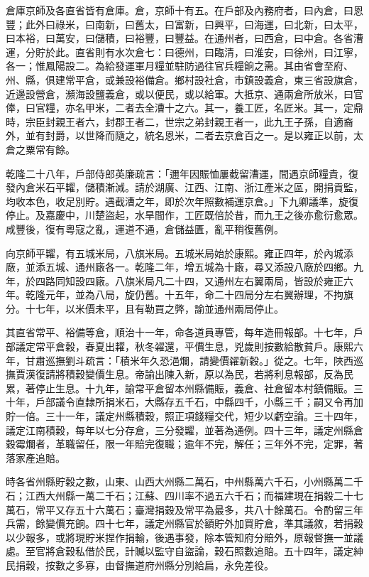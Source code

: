\begin{pinyinscope}
倉庫京師及各直省皆有倉庫。倉，京師十有五。在戶部及內務府者，曰內倉，曰恩豐；此外曰祿米，曰南新，曰舊太，曰富新，曰興平，曰海運，曰北新，曰太平，曰本裕，曰萬安，曰儲積，曰裕豐，曰豐益。在通州者，曰西倉，曰中倉。各省漕運，分貯於此。直省則有水次倉七：曰德州，曰臨清，曰淮安，曰徐州，曰江寧，各一；惟鳳陽設二。為給發運軍月糧並駐防過往官兵糧餉之需。其由省會至府、州、縣，俱建常平倉，或兼設裕備倉。鄉村設社倉，市鎮設義倉，東三省設旗倉，近邊設營倉，瀕海設鹽義倉，或以便民，或以給軍。大抵京、通兩倉所放米，曰官俸，曰官糧，亦名甲米，二者去全漕十之六。其一，養工匠，名匠米。其一，定鼎時，宗臣封親王者六，封郡王者二，世宗之弟封親王者一，此九王子孫，自適裔外，並有封爵，以世降而隨之，統名恩米，二者去京倉百之一。是以雍正以前，太倉之粟常有餘。

乾隆二十八年，戶部侍郎英廉疏言：「邇年因賑恤屢截留漕運，間遇京師糧貴，復發內倉米石平糶，儲積漸減。請於湖廣、江西、江南、浙江產米之區，開捐貢監，均收本色，收足別貯。遇截漕之年，即於次年照數補運京倉。」下九卿議準，旋復停止。及嘉慶中，川楚盜起，水旱間作，工匠既倍於昔，而九王之後亦愈衍愈眾。咸豐後，復有粵寇之亂，運道不通，倉儲益匱，亂平稍復舊例。

向京師平糶，有五城米局，八旗米局。五城米局始於康熙。雍正四年，於內城添廠，並添五城、通州廠各一。乾隆二年，增五城為十廠，尋又添設八廠於四鄉。九年，於四路同知設四廠。八旗米局凡二十四，又通州左右翼兩局，皆設於雍正六年。乾隆元年，並為八局，旋仍舊。十五年，命二十四局分左右翼辦理，不拘旗分。十七年，以米價未平，且有勒買之弊，諭並通州兩局停止。

其直省常平、裕備等倉，順治十一年，命各道員專管，每年造冊報部。十七年，戶部議定常平倉穀，春夏出糶，秋冬糴還，平價生息，兇歲則按數給散貧戶。康熙六年，甘肅巡撫劉斗疏言：「積米年久恐浥爛，請變價糴新穀。」從之。七年，陜西巡撫賈漢復請將積穀變價生息。帝諭出陳入新，原以為民，若將利息報部，反為民累，著停止生息。十九年，諭常平倉留本州縣備賑，義倉、社倉留本村鎮備賑。三十年，戶部議令直隸所捐米石，大縣存五千石，中縣四千，小縣三千；嗣又令再加貯一倍。三十一年，議定州縣積穀，照正項錢糧交代，短少以虧空論。三十四年，議定江南積穀，每年以七分存倉，三分發糶，並著為通例。四十三年，議定州縣倉穀霉爛者，革職留任，限一年賠完復職；逾年不完，解任；三年外不完，定罪，著落家產追賠。

時各省州縣貯穀之數，山東、山西大州縣二萬石，中州縣萬六千石，小州縣萬二千石；江西大州縣一萬二千石；江蘇、四川率不過五六千石；而福建現在捐穀二十七萬石，常平又存五十六萬石；臺灣捐穀及常平為最多，共八十餘萬石。令酌留三年兵需，餘變價充餉。四十七年，議定州縣官於額貯外加買貯倉，準其議敘，若捐穀以少報多，或將現貯米捏作捐輸，後遇事發，除本管知府分賠外，原報督撫一並議處。至官將倉穀私借於民，計贓以監守自盜論，穀石照數追賠。五十四年，議定紳民捐穀，按數之多寡，由督撫道府州縣分別給扁，永免差役。


\end{pinyinscope}
